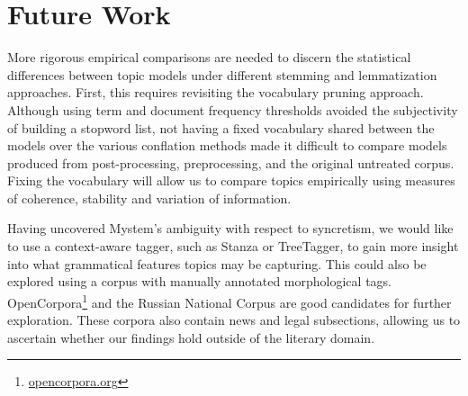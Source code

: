 \documentclass[11pt,a4paper]{article}
\begin{document}
\section{Future Work}
More rigorous empirical comparisons are needed to discern the statistical differences between topic models under different stemming and lemmatization approaches. First, this requires revisiting the vocabulary pruning approach. Although using term and document frequency thresholds avoided the subjectivity of building a stopword list, not having a fixed vocabulary shared between the models over the various conflation methods made it difficult to compare models produced from post-processing, preprocessing, and the original untreated corpus. Fixing the vocabulary will allow us to compare topics empirically using measures of coherence, stability and variation of information.

Having uncovered Mystem's ambiguity with respect to syncretism, we would like to use a context-aware tagger, such as Stanza or TreeTagger, to gain more insight into what grammatical features topics may be capturing. This could also be explored using a corpus with manually annotated morphological tags. OpenCorpora\footnote{\url{opencorpora.org}} and the Russian National Corpus are good candidates for further exploration. These corpora also contain news and legal subsections, allowing us to ascertain whether our findings hold outside of the literary domain.




\appendix
\onecolumn
\end{document}
